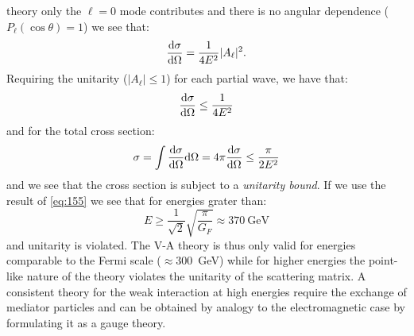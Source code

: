 theory only the $\ell = 0$ mode contributes and there is no angular dependence
($P_\ell(\cos \theta) = 1$) we see that:
\begin{equation}
  \label{eq:157}
  \frac{\mathrm{d} \sigma}{\mathrm{d} \Omega} = \frac{1}{4E^2} |A_\ell|^2.
\end{equation}
Requiring the unitarity ($|A_\ell| \leq 1$) for each partial wave, we have that:
\begin{equation}
  \label{eq:158}
  \frac{\mathrm{d} \sigma}{\mathrm{d} \Omega} \leq \frac{1}{4 E^2}
\end{equation}
and for the total cross section:
\begin{equation}
  \label{eq:159}
  \sigma = \int \frac{\mathrm{d} \sigma}{\mathrm{d} \Omega} \mathrm{d} \Omega = 4 \pi \frac{\mathrm{d}
    \sigma}{\mathrm{d} \Omega} \leq \frac{\pi}{2E^2}
\end{equation}
and we see that the cross section is subject to a \emph{unitarity bound}. If we
use the result of \cref{eq:155} we see that for energies grater than:
\begin{equation}
  \label{eq:160}
  E \geq \frac{1}{\sqrt{2}} \sqrt{\frac{\pi}{G_F}} \approx 370~\mathrm{GeV}
\end{equation}
and unitarity is violated. The V-A theory is thus only valid for energies
comparable to the Fermi scale ($\approx 300$~GeV) while for higher energies the
point-like nature of the theory violates the unitarity of the scattering
matrix. A consistent theory for the weak interaction at high energies require
the exchange of mediator particles and can be obtained by analogy to the
electromagnetic case by formulating it as a gauge theory.

